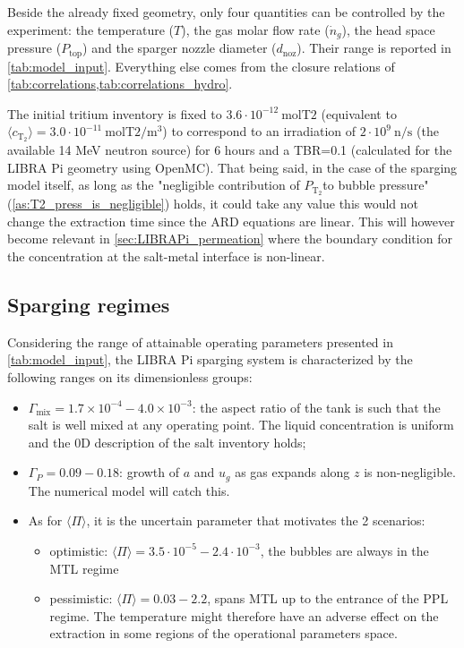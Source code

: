 \documentclass[a4paper,11pt,oneside]{report}
\newcommand{\PT}{\ensuremath{P_\mathrm{T_2}}}
\newcommand{\CT}{\ensuremath{c_\mathrm{T_2}}}
\newcommand{\Gmix}{\ensuremath{\Gamma_\mathrm{mix}}}
\newcommand{\Gp}{\ensuremath{\Gamma_P}}
\newcommand{\PI}{\ensuremath{\langle \Pi \rangle}}
\newcommand{\ndotg}{\ensuremath{\dot n_g}}
\newcommand{\dnoz}{\ensuremath{d_\mathrm{noz}}}
\newcommand{\Ptop}{\ensuremath{P_\mathrm{top}}}
\begin{document}
Beside the already fixed geometry, only four quantities can be controlled by the experiment: the temperature ($T$), the gas molar flow rate (\ndotg), the head space pressure (\Ptop) and the sparger nozzle diameter (\dnoz). Their range is reported in \cref{tab:model_input}. Everything else comes from the closure relations of \cref{tab:correlations,tab:correlations_hydro}. 

The initial tritium inventory is fixed to $3.6\cdot10^{-12} \ \mathrm{molT2}$ (equivalent to $\langle\CT\rangle =3.0\cdot10^{-11} \ \mathrm{molT2/m^3}$) to correspond to an irradiation of $2\cdot10^{9} \ \mathrm{n/s}$ (the available 14 MeV neutron source) for 6 hours and a TBR=0.1 (calculated for the LIBRA Pi geometry using OpenMC). That being said, in the case of the sparging model itself, as long as the "negligible contribution of \PT to bubble pressure" (\cref{as:T2_press_is_negligible}) holds, it could take any value this would not change the extraction time since the ARD equations are linear. This will however become relevant in \cref{sec:LIBRAPi_permeation} where the boundary condition for the concentration at the salt-metal interface is non-linear. 



\subsection{Sparging regimes}


Considering the range of attainable operating parameters presented in \cref{tab:model_input}, the LIBRA Pi sparging system is characterized by the following ranges on its dimensionless groups:
\begin{itemize}
    \item $\Gmix=1.7\times10^{-4}-4.0\times10^{-3}$: the aspect ratio of the tank is such that the salt is well mixed at any operating point. The liquid concentration is uniform and the 0D description of the salt inventory holds;
    \item $\Gp=0.09-0.18$: growth of $a$ and $u_g$ as  gas expands along $z$ is non-negligible. The numerical model will catch this. 
    \item As for $\PI$, it is the uncertain parameter that motivates the 2 scenarios:
    \begin{itemize}
        \item optimistic: $\PI=3.5\cdot10^{-5}-2.4\cdot10^{-3}$, the bubbles are always in the MTL regime
        \item pessimistic: $\PI=0.03-2.2$, spans MTL up to the entrance of the PPL regime. The temperature might therefore have an adverse effect on the extraction in some regions of the operational parameters space. 
    \end{itemize}
\end{itemize}
\end{document}
